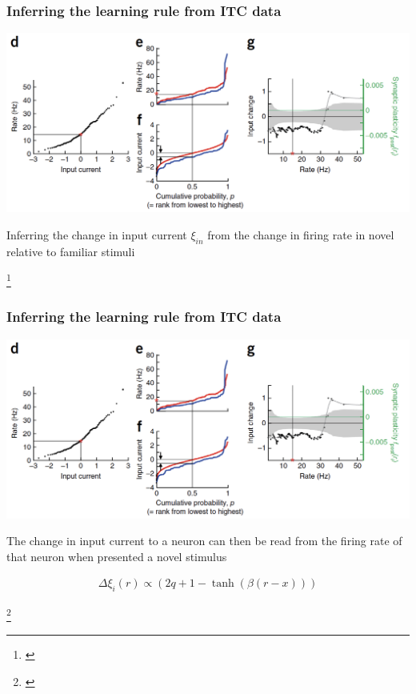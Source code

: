 \documentclass{beamer}
\begin{document}
\begin{frame}[plain]
\frametitle{Inferring the learning rule from ITC data}

\begin{center}
\includegraphics[scale=0.55]{learning-rules}
\end{center}

Inferring the change in input current $\xi_{in}$ from the change in firing rate in {\color{red} novel} relative to {\color{blue} familiar} stimuli

\footnote{\cite{lim}}

\end{frame}

\begin{frame}[plain]
\frametitle{Inferring the learning rule from ITC data}

\begin{center}
\includegraphics[scale=0.55]{learning-rules}
\end{center}

The change in input current to a neuron can then be read from the firing rate of that neuron when presented a novel stimulus

\begin{align*}
\Delta \xi_{i}(r) \propto (2q + 1 - \tanh (\beta (r-x)))
\end{align*}

\footnote{\cite{lim}}

\end{frame}
\end{document}
